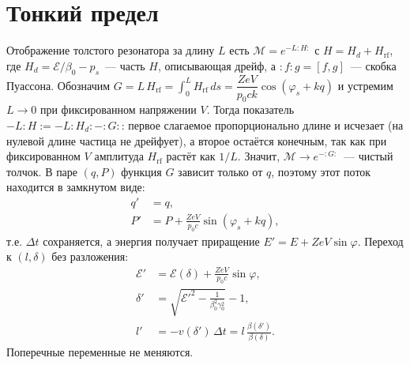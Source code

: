 \documentclass[a4paper,11pt]{article}
\numberwithin{equation}{section}
\newcommand{\rf}{\mathrm{rf}}
\newcommand{\cE}{\mathcal{E}}
\begin{document}
\section{Тонкий предел}
Отображение толстого резонатора за длину $L$ есть $\mathcal M=e^{-L:H:}$ с $H=H_d+H_\rf$, где $H_d=\cE/\beta_0-p_s$~---
часть $H$, описывающая дрейф, а $:f:g=[f,g]$~--- скобка Пуассона. Обозначим
$G=L\,H_\rf=\int_0^LH_\rf\,ds=\dfrac{ZeV}{p_0ck}\cos(\varphi_s+kq)$ и устремим $L\to0$ при фиксированном
напряжении $V$. Тогда показатель $-L:H:=-L:H_d:-:G:$: первое слагаемое пропорционально длине и исчезает
(на нулевой длине частица не дрейфует), а второе остаётся конечным, так как при фиксированном $V$
амплитуда $H_\rf$ растёт как $1/L$. Значит, $\mathcal M\to e^{-:G:}$~--- чистый толчок. В паре $(q,P)$ функция $G$
зависит только от $q$, поэтому этот поток находится в замкнутом виде:
\begin{equation}
\begin{aligned}
q'&=q,\\
P'&=P+\frac{ZeV}{p_0c}\sin(\varphi_s+kq),
\end{aligned}
\end{equation}
т.е. $\Delta t$ сохраняется, а энергия получает приращение $E'=E+ZeV\sin\varphi$. Переход к $(l,\delta)$ без разложения:
\begin{equation}
\begin{aligned}
\cE'&=\cE(\delta)+\frac{ZeV}{p_0c}\sin\varphi,\\
\delta'&=\sqrt{\cE'^2-\frac{1}{\beta_0^2\gamma_0^2}}-1,\\
l'&=-v(\delta')\,\Delta t = l\,\frac{\beta(\delta')}{\beta(\delta)} .
\end{aligned} \label{eq:thin}
\end{equation}
Поперечные переменные не меняются.
\end{document}
